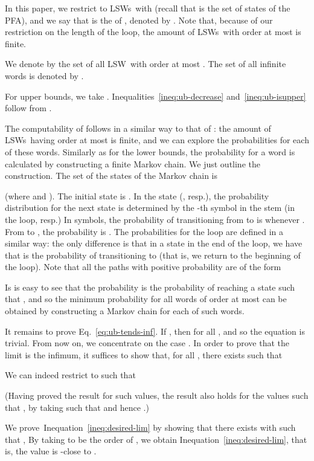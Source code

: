 \documentclass[final,3p,times,twocolumn]{elsarticle}
\theoremstyle{plain}
\theoremstyle{definition}
\newcommand{\recallEquation}[1]{Eq.~\ref{#1}}
\newcommand{\recallInequation}[1]{Inequation~\ref{#1}}
\newcommand{\lsw}{LSW}
\newcommand{\lsws}{LSWs}
\begin{document}
In this paper, we restrict to \lsws\ with  (recall
that  is the set of states of the PFA), and we say that  is the
 of , denoted by . Note that, because of
our restriction on the length of the loop, the amount of \lsws\ with order at
most  is finite.

We denote by  the set of all \lsw\ with order at most .
The set of all infinite words is denoted by .

For upper bounds, we take
.
Inequalities~\ref{ineq:ub-decrease} and~\ref{ineq:ub-isupper} follow from
.

The computability of  follows in a similar way to that of
: the amount of \lsws\ having order at most  is finite, and we
can explore the probabilities for each of these words. Similarly as for the
lower bounds, the probability for a word  is calculated
by constructing a finite Markov chain. We just outline the construction. The
set of the states of the Markov chain is
\newcommand{\isstem}{\mathsf{S}}
\newcommand{\isloop}{\mathsf{L}}

(where  and ).
The initial state is . In the state 
(, resp.), the probability distribution for the next state is
determined by the -th symbol in the stem (in the loop, resp.) In symbols, the
probability of transitioning from  to
 is  whenever
. From  to
, the probability is
. The probabilities for the loop are
defined in a similar way: the only difference is that in a state
 in the end of the loop, we have that
 is the probability of transitioning to
 (that is, we return to the beginning of the loop). Note that
all the paths with positive probability are of the form

Is is easy to see that the probability
 is the probability of reaching a state
 such that , and so the minimum probability for all
words of order at most  can be obtained by constructing a Markov chain for
each of such words.

It remains to prove \recallEquation{eq:ub-tends-inf}.
If , then  for all , and so the equation
is trivial. From now on, we concentrate on the case . In order to
prove that the limit is the infimum, it suffices to show that, for all
, there exists  such that

We can indeed restrict to  such that

(Having proved the result for such values, the result also holds for the values
 such that , by taking  such
that   and hence
.)

We prove~\recallInequation{ineq:desired-lim} by showing that there exists
 with
 such that ,
By taking  to be the order of , we obtain
\recallInequation{ineq:desired-lim}, that is, the value 
is -close to .
\end{document}
